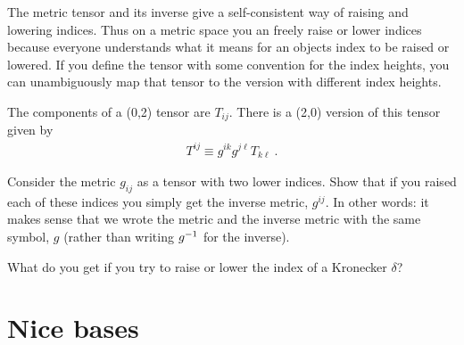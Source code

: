 \documentclass[12pt, oneside]{report}    %
\let\oldsection\section
\def\section{%
  \setcounter{sidenote}{1}%
  \oldsection
}
\begin{document}
The metric tensor and its inverse give a self-consistent way of raising and lowering indices. Thus on a metric space you an freely raise or lower indices because everyone understands what it means for an objects index to be raised or lowered. If you define the tensor with some convention for the index heights, you can unambiguously map that tensor to the version with different index heights. 

\begin{example}
The components of a (0,2) tensor are $T_{ij}$. There is a (2,0) version of this tensor given by
\begin{align}
    T^{ij} \equiv g^{ik}g^{j\ell}T_{k\ell} \ .
\end{align}
\end{example}

\begin{exercise}
Consider the metric $g_{ij}$ as a tensor with two lower indices. Show that if you raised each of these indices you simply get the inverse metric, $g^{ij}$. In other words: it makes sense that we wrote the metric and the inverse metric with the same symbol, $g$ (rather than writing $g^{-1}$ for the inverse).
\end{exercise}

\begin{exercise}
What do you get if you try to raise or lower the index of a Kronecker $\delta$?
\end{exercise}

\section{Nice bases}
\end{document}
